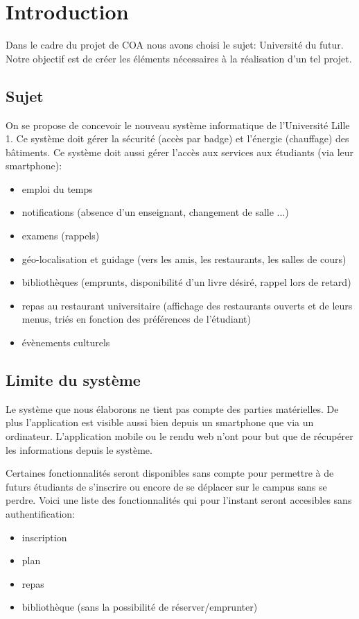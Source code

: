 \chapter{Introduction}

Dans le cadre du projet de COA nous avons choisi le sujet: Université du futur.
Notre objectif est de créer les éléments nécessaires à la réalisation d'un tel projet.

\section{Sujet}

On se propose de concevoir le nouveau système informatique de l’Université Lille 1.
Ce système doit gérer la sécurité (accès par badge) et l’énergie (chauffage) des bâtiments.
Ce système doit aussi gérer l’accès aux services aux étudiants (via leur smartphone): 
\begin{itemize}
\item emploi du temps
\item notifications (absence d'un enseignant, changement de salle ...)
\item examens (rappels)
\item géo-localisation et guidage (vers les amis, les restaurants, les salles de cours)
\item bibliothèques (emprunts, disponibilité d’un livre désiré, rappel lors de retard)
\item repas au restaurant universitaire (affichage des restaurants ouverts et de leurs menus, triés en fonction des préférences de l’étudiant)
\item évènements culturels 
\end{itemize}

\section{Limite du système}

Le système que nous élaborons ne tient pas compte des parties matérielles. De plus l'application est visible aussi bien depuis un smartphone que via un ordinateur. L'application mobile ou le rendu web n'ont pour but que de récupérer les informations depuis le système.

Certaines fonctionnalités seront disponibles sans compte pour permettre à de futurs étudiants de s'inscrire ou encore de se déplacer sur le campus sans se perdre.
Voici une liste des fonctionnalités qui pour l'instant seront accesibles sans authentification:

\begin{itemize}
\item inscription
\item plan
\item repas
\item bibliothèque (sans la possibilité de réserver/emprunter)
\end{itemize}
